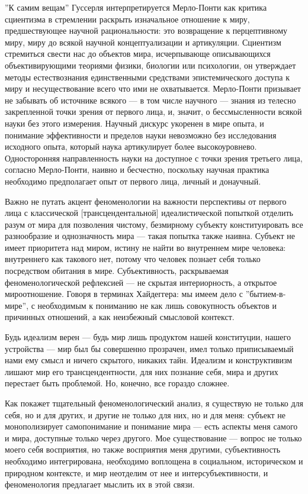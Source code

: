 \documentclass[11pt]{book}
\begin{document}
''К самим вещам'' Гуссерля интерпретируется Мерло-Понти как критика сциентизма в стремлении раскрыть изначальное отношение к миру, предшествующее научной рациональности: это возвращение к перцептивному миру, миру до всякой научной концептуализации и артикуляции. Сциентизм стремиться свести нас до объектов мира, исчерпывающе описывающихся объективирующими теориями физики, биологии или психологии, он утверждает методы естествознания единственными средствами эпистемического доступа к миру и несуществование всего что ими не охватывается. Мерло-Понти призывает не забывать об источнике всякого --- в том числе научного --- знания из телесно закрепленной точки зрения от первого лица, и, значит, о бессмысленности всякой науки без этого измерения. Научный дискурс укоренен в мире опыта, и понимание эффективности и пределов науки невозможно без исследования исходного опыта, который наука артикулирует более высокоуровнево. Односторонняя направленность науки на доступное с точки зрения третьего лица, согласно Мерло-Понти, наивно и бесчестно, поскольку научная практика необходимо предполагает опыт от первого лица, личный и донаучный.

Важно не путать акцент феноменологии на важности перспективы от первого лица с классической [трансцендентальной] идеалистической попыткой отделить разум от мира для позволения чистому, безмирному субъекту конституировать все разнообразие и однозначность мира --- такая попытка также наивна. Субъект не имеет приоритета над миром, истину не найти во внутреннем мире человека: внутреннего как такового нет, потому что человек познает себя только посредством обитания в мире. Субъективность, раскрываемая феноменологической рефлексией --- не скрытая интериорность, а открытое мироотношение. Говоря в терминах Хайдеггера: мы имеем дело с ''бытием-в-мире'', с необходимым к пониманию не как лишь совокупность объектов и причинных отношений, а как неизбежный смысловой контекст.

Будь идеализм верен --- будь мир лишь продуктом нашей конституции, нашего устройства --- мир был бы совершенно прозрачен, имел только приписываемый нами ему смысл и ничего скрытого, никаких тайн. Идеализм и конструктивизм лишают мир его трансцендентности, для них познание себя, мира и других перестает быть проблемой. Но, конечно, все гораздо сложнее.

Как покажет тщательный феноменологический анализ, я существую не только для себя, но и для других, и другие не только для них, но и для меня: субъект не монополизирует самопонимание и понимание мира --- есть аспекты меня самого и мира, доступные только через другого. Мое существование --- вопрос не только моего себя восприятия, но также восприятия меня другими, субъективность необходимо интегрирована, необходимо воплощена в социальном, историческом и природном контексте, и мир неотделим от нее и интерсубъективности, и феноменология предлагает мыслить их в этой связи.
\end{document}

